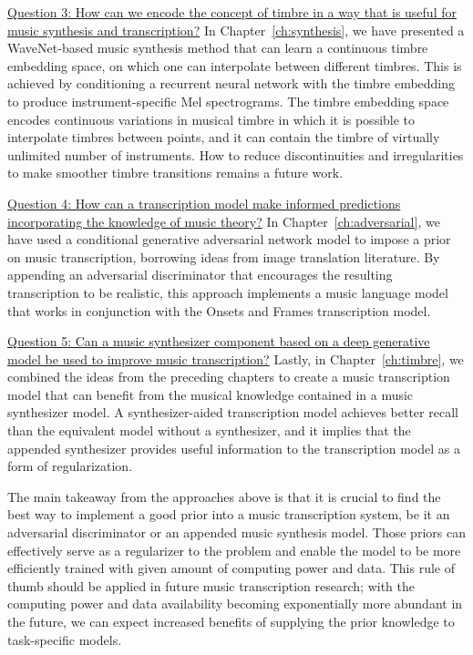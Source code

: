 \uline{Question 3: How can we encode the concept of timbre in a way that is useful for music synthesis and transcription?}
In Chapter~\ref{ch:synthesis}, we have presented a WaveNet-based music synthesis method that can learn a continuous timbre embedding space, on which one can interpolate between different timbres.
This is achieved by conditioning a recurrent neural network with the timbre embedding to produce instrument-specific Mel spectrograms.
The timbre embedding space encodes continuous variations in musical timbre in which it is possible to interpolate timbres between points, and it can contain the timbre of virtually unlimited number of instruments.
How to reduce discontinuities and irregularities to make smoother timbre transitions remains a future work.

\uline{Question 4: How can a transcription model make informed predictions incorporating the knowledge of music theory?}
In Chapter~\ref{ch:adversarial}, we have used a conditional generative adversarial network model to impose a prior on music transcription, borrowing ideas from image translation literature.
By appending an adversarial discriminator that encourages the resulting transcription to be realistic, this approach implements a music language model that works in conjunction with the Onsets and Frames transcription model.

\uline{Question 5: Can a music synthesizer component based on a deep generative model be used to improve music transcription?}
Lastly, in Chapter~\ref{ch:timbre}, we combined the ideas from the preceding chapters to create a music transcription model that can benefit from the musical knowledge contained in a music synthesizer model.
A synthesizer-aided transcription model achieves better recall than the equivalent model without a synthesizer, and it implies that the appended synthesizer provides useful information to the transcription model as a form of regularization.


The main takeaway from the approaches above is that it is crucial to find the best way to implement a good prior into a music transcription system, be it an adversarial discriminator or an appended music synthesis model.
Those priors can effectively serve as a regularizer to the problem and enable the model to be more efficiently trained with given amount of computing power and data.
This rule of thumb should be applied in future music transcription research; with the computing power and data availability becoming exponentially more abundant in the future, we can expect increased benefits of supplying the prior knowledge to task-specific models.


